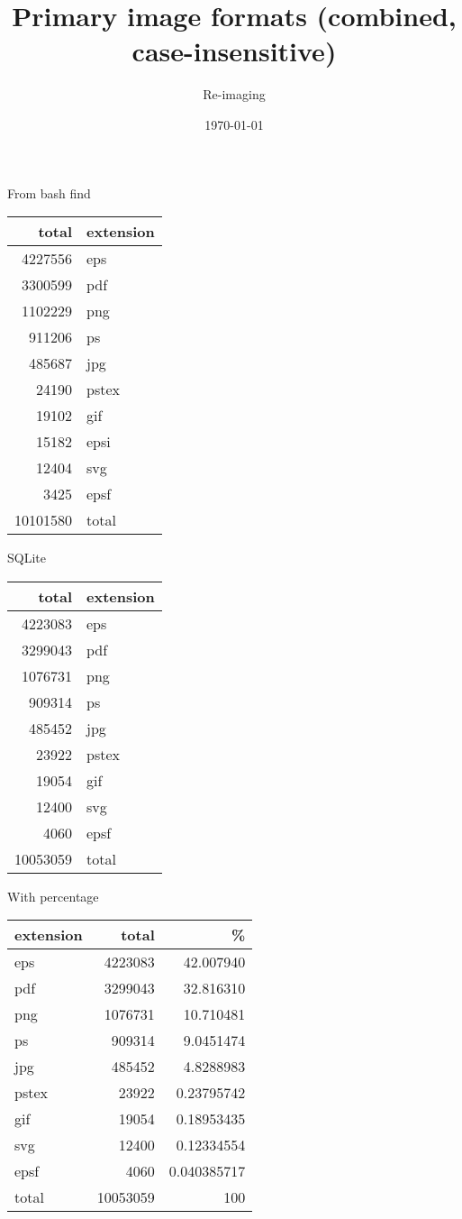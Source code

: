 \documentclass[11pt]{article}
\author{Re-imaging}
\date{\today}
\title{Primary image formats (combined, case-insensitive)}
\begin{document}
\maketitle
\tableofcontents

From bash find

\begin{center}
\begin{tabular}{rl}
\hline
total & extension\\
\hline
4227556 & eps\\
3300599 & pdf\\
1102229 & png\\
911206 & ps\\
485687 & jpg\\
24190 & pstex\\
19102 & gif\\
15182 & epsi\\
12404 & svg\\
3425 & epsf\\
\hline
10101580 & total\\
\hline
\end{tabular}
\end{center}

SQLite

\begin{center}
\begin{tabular}{rl}
\hline
total & extension\\
\hline
4223083 & eps\\
3299043 & pdf\\
1076731 & png\\
909314 & ps\\
485452 & jpg\\
23922 & pstex\\
19054 & gif\\
12400 & svg\\
4060 & epsf\\
\hline
10053059 & total\\
\hline
\end{tabular}
\end{center}

With percentage

\begin{center}
\begin{tabular}{lrr}
\hline
extension & total & \%\\
\hline
eps & 4223083 & 42.007940\\
pdf & 3299043 & 32.816310\\
png & 1076731 & 10.710481\\
ps & 909314 & 9.0451474\\
jpg & 485452 & 4.8288983\\
pstex & 23922 & 0.23795742\\
gif & 19054 & 0.18953435\\
svg & 12400 & 0.12334554\\
epsf & 4060 & 0.040385717\\
\hline
total & 10053059 & 100\\
\hline
\end{tabular}
\end{center}
\end{document}
